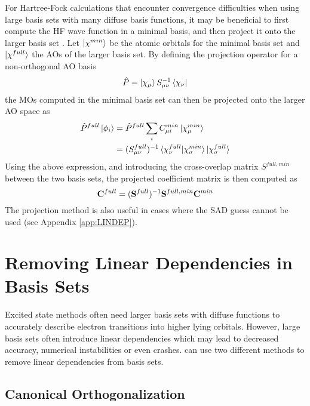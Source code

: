 For Hartree-Fock calculations that encounter convergence difficulties when using large basis sets with many diffuse basis functions, it may be beneficial to first compute the HF wave function in a minimal basis, and then project it onto the larger basis set \cite{Leh2019}. Let $\ket{\smash{\chi^{min}}}$ be the atomic orbitals for the minimal basis set and $\ket{\smash{\chi^{full}}}$ the AOs of the larger basis set. By defining the projection operator for a non-orthogonal AO basis
\begin{equation}
\hat{P} = \ket{\smash{\chi_{\mu}}} S_{\mu\nu}^{-1} \bra{\smash{\chi_{\nu}}}
\end{equation}
\noindent the MOs computed in the minimal basis set can then be projected onto the larger AO space as
\begin{equation}
\begin{split}
\hat{P}^{full}\ket{\smash{\phi_i}} &= \hat{P}^{full}\sum_i C^{min}_{\mu i} \ket{\smash{\chi^{min}_\mu}} \\
	&= (S^{full}_{\mu\nu})^{-1} \bra{\smash{\chi^{full}_{\nu}}}\ket{\smash{\chi^{min}_{\sigma}}} \ket{\smash{\chi^{full}_{\sigma}}}
\end{split} 
\end{equation}
\noindent Using the above expression, and introducing the cross-overlap matrix $S^{full,min}$ between the two basis sets, the projected coefficient matrix is then computed as
\begin{equation}
\mathbf{C}^{full} = (\mathbf{S}^{full})^{-1} \mathbf{S}^{full,min} \mathbf{C}^{min} 
\end{equation}
\noindent The projection method is also useful in cases where the SAD guess cannot be used (see Appendix \ref{app:LINDEP}). 

\chapter{Removing Linear Dependencies in Basis Sets \label{app:LINDEP}}

Excited state methods often need larger basis sets with diffuse functions to accurately describe electron transitions into higher lying orbitals. However, large basis sets often introduce linear dependencies which may lead to decreased accuracy, numerical instabilities or even crashes. \mchem{} can use two different methods to remove linear dependencies from basis sets.

\section{Canonical Orthogonalization}

